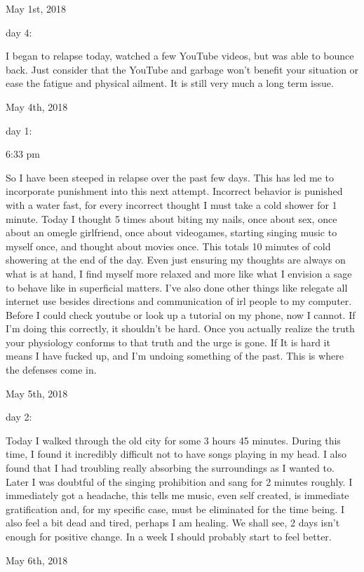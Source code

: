 \bigskip
\bigskip
May 1st, 2018

day 4:

I began to relapse today, watched a few YouTube videos, but was able to
bounce back. Just consider that the YouTube and garbage won't benefit
your situation or ease the fatigue and physical ailment. It is still
very much a long term issue.

\bigskip
\bigskip
May 4th, 2018

day 1:

6:33 pm

So I have been steeped in relapse over the past few days. This has led
me to incorporate punishment into this next attempt. Incorrect behavior
is punished with a water fast, for every incorrect thought I must take a
cold shower for 1 minute. Today I thought 5 times about biting my nails,
once about sex, once about an omegle girlfriend, once about videogames,
starting singing music to myself once, and thought about movies once.
This totals 10 minutes of cold showering at the end of the day. Even
just ensuring my thoughts are always on what is at hand, I find myself
more relaxed and more like what I envision a sage to behave like in
superficial matters. I've also done other things like relegate all
internet use besides directions and communication of irl people to my
computer. Before I could check youtube or look up a tutorial on my
phone, now I cannot. If I'm doing this correctly, it shouldn't be hard.
Once you actually realize the truth your physiology conforms to that
truth and the urge is gone. If It is hard it means I have fucked up, and
I'm undoing something of the past. This is where the defenses come in.

\bigskip
\bigskip
May 5th, 2018

day 2:

Today I walked through the old city for some 3 hours 45 minutes. During
this time, I found it incredibly difficult not to have songs playing in
my head. I also found that I had troubling really absorbing the
surroundings as I wanted to. Later I was doubtful of the singing
prohibition and sang for 2 minutes roughly. I immediately got a
headache, this tells me music, even self created, is immediate
gratification and, for my specific case, must be eliminated for the time
being. I also feel a bit dead and tired, perhaps I am healing. We shall
see, 2 days isn't enough for positive change. In a week I should
probably start to feel better.

\bigskip
\bigskip
May 6th, 2018

